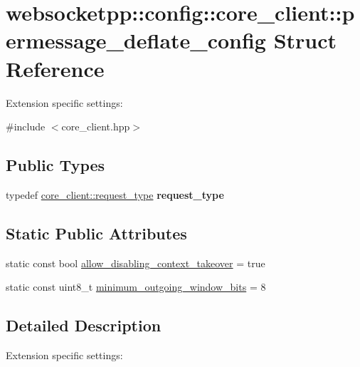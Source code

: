 \hypertarget{structwebsocketpp_1_1config_1_1core__client_1_1permessage__deflate__config}{}\section{websocketpp\+:\+:config\+:\+:core\+\_\+client\+:\+:permessage\+\_\+deflate\+\_\+config Struct Reference}
\label{structwebsocketpp_1_1config_1_1core__client_1_1permessage__deflate__config}


Extension specific settings\+:  




{\ttfamily \#include $<$core\+\_\+client.\+hpp$>$}

\subsection*{Public Types}
\begin{DoxyCompactItemize}
\item 
\mbox{\label{structwebsocketpp_1_1config_1_1core__client_1_1permessage__deflate__config_ad232507a23e7a2c6c70ae631dc87b80d}} 
typedef \mbox{\hyperlink{classwebsocketpp_1_1http_1_1parser_1_1request}{core\+\_\+client\+::request\+\_\+type}} {\bfseries request\+\_\+type}
\end{DoxyCompactItemize}
\subsection*{Static Public Attributes}
\begin{DoxyCompactItemize}
\item 
static const bool \mbox{\hyperlink{structwebsocketpp_1_1config_1_1core__client_1_1permessage__deflate__config_ab7cbd54d076521a3edf75bb44144d676}{allow\+\_\+disabling\+\_\+context\+\_\+takeover}} = true
\item 
static const uint8\+\_\+t \mbox{\hyperlink{structwebsocketpp_1_1config_1_1core__client_1_1permessage__deflate__config_a0ac8d0ba3a5fcc0220cd282b2e18242c}{minimum\+\_\+outgoing\+\_\+window\+\_\+bits}} = 8
\end{DoxyCompactItemize}


\subsection{Detailed Description}
Extension specific settings\+: 

